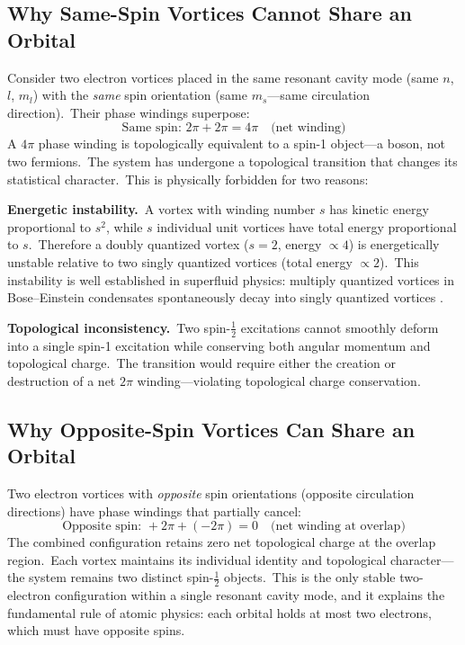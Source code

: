 ﻿\documentclass[12pt,letterpaper]{article}
\begin{document}
\subsection{Why Same-Spin Vortices Cannot Share an Orbital}

Consider two electron vortices placed in the same resonant cavity mode (same $n$,
$l$, $m_l$) with the \emph{same} spin orientation (same $m_s$---same circulation
direction).\ Their phase windings superpose:
%
\begin{equation}
  \text{Same spin: } 2\pi + 2\pi = 4\pi \quad\text{(net winding)}
\end{equation}
%
A $4\pi$ phase winding is topologically equivalent to a spin-1 object---a boson,
not two fermions.\ The system has undergone a topological transition that changes
its statistical character.\ This is physically forbidden for two reasons:

\textbf{Energetic instability.}\ A vortex with winding number $s$ has kinetic
energy proportional to $s^2$, while $s$ individual unit vortices have total energy
proportional to $s$.\ Therefore a doubly quantized vortex ($s = 2$, energy
$\propto 4$) is energetically unstable relative to two singly quantized vortices
(total energy $\propto 2$).\ This instability is well established in superfluid
physics: multiply quantized vortices in Bose--Einstein condensates spontaneously
decay into singly quantized vortices \cite{shin2004}.

\textbf{Topological inconsistency.}\ Two spin-$\tfrac{1}{2}$ excitations cannot
smoothly deform into a single spin-1 excitation while conserving both angular
momentum and topological charge.\ The transition would require either the creation
or destruction of a net $2\pi$ winding---violating topological charge conservation.

\subsection{Why Opposite-Spin Vortices Can Share an Orbital}

Two electron vortices with \emph{opposite} spin orientations (opposite circulation
directions) have phase windings that partially cancel:
%
\begin{equation}
  \text{Opposite spin: } +2\pi + (-2\pi) = 0 \quad\text{(net winding at overlap)}
\end{equation}
%
The combined configuration retains zero net topological charge at the overlap
region.\ Each vortex maintains its individual identity and topological character---the
system remains two distinct spin-$\tfrac{1}{2}$ objects.\ This is the only stable
two-electron configuration within a single resonant cavity mode, and it explains
the fundamental rule of atomic physics: each orbital holds at most two electrons,
which must have opposite spins.
\end{document}
